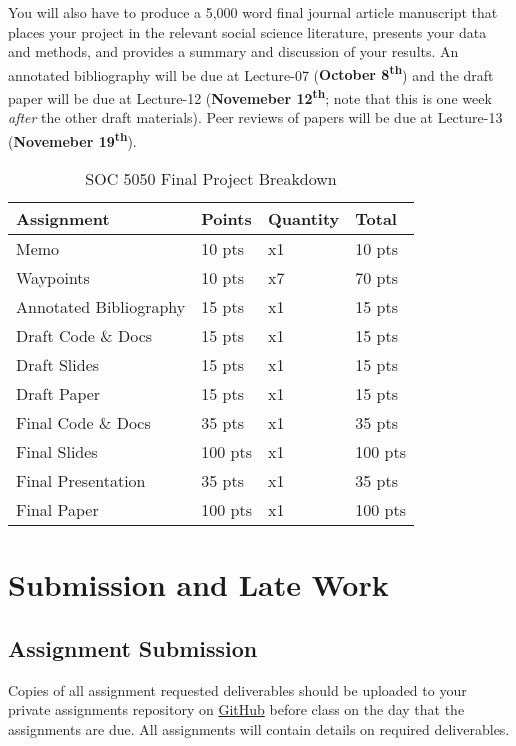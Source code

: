 \documentclass[]{book}
\theoremstyle{definition}
\theoremstyle{definition}
\theoremstyle{definition}
\theoremstyle{remark}
\begin{document}
You will also have to produce a 5,000 word final journal article
manuscript that places your project in the relevant social science
literature, presents your data and methods, and provides a summary and
discussion of your results. An annotated bibliography will be due at
Lecture-07 (\textbf{October 8\textsuperscript{th}}) and the draft paper
will be due at Lecture-12 (\textbf{Novemeber 12\textsuperscript{th}};
note that this is one week \emph{after} the other draft materials). Peer
reviews of papers will be due at Lecture-13 (\textbf{Novemeber
19\textsuperscript{th}}).

\begin{table}

\caption{\label{tab:unnamed-chunk-7}SOC 5050 Final Project Breakdown}
\centering
\begin{tabular}[t]{llll}
\toprule
Assignment & Points & Quantity & Total\\
\midrule
Memo & 10 pts & x1 & 10 pts\\
Waypoints & 10 pts & x7 & 70 pts\\
Annotated Bibliography & 15 pts & x1 & 15 pts\\
Draft Code \& Docs & 15 pts & x1 & 15 pts\\
Draft Slides & 15 pts & x1 & 15 pts\\
\addlinespace
Draft Paper & 15 pts & x1 & 15 pts\\
Final Code \& Docs & 35 pts & x1 & 35 pts\\
Final Slides & 100 pts & x1 & 100 pts\\
Final Presentation & 35 pts & x1 & 35 pts\\
Final Paper & 100 pts & x1 & 100 pts\\
\bottomrule
\end{tabular}
\end{table}

\hypertarget{submission-and-late-work}{%
\section{Submission and Late Work}\label{submission-and-late-work}}

\hypertarget{assignment-submission}{%
\subsection{Assignment Submission}\label{assignment-submission}}

Copies of all assignment requested deliverables should be uploaded to
your private assignments repository on
\href{https://github.com/slu-soc5650}{GitHub} before class on the day
that the assignments are due. All assignments will contain details on
required deliverables.
\end{document}
